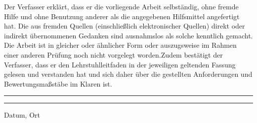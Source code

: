 Der Verfasser erklärt, dass er die vorliegende Arbeit selbständig, ohne fremde Hilfe und ohne Benutzung anderer als die angegebenen Hilfsmittel angefertigt hat. Die aus fremden Quellen (einschließlich elektronischer Quellen) direkt oder indirekt übernommenen Gedanken sind ausnahmslos als solche kenntlich gemacht. Die Arbeit ist in gleicher oder ähnlicher Form oder auszugsweise im Rahmen einer anderen Prüfung noch nicht vorgelegt worden.Zudem bestätigt der Verfasser, dass er den Lehrstuhlleitfaden in der jeweiligen geltenden Fassung gelesen und verstanden hat und sich daher über die gestellten Anforderungen und Bewertungsmaßstäbe im Klaren ist. \\[4cm]
\noindent\rule{5cm}{.4pt}\hfill\rule{5cm}{.4pt}\par 
\noindent Datum, Ort \hfill \autor \\
